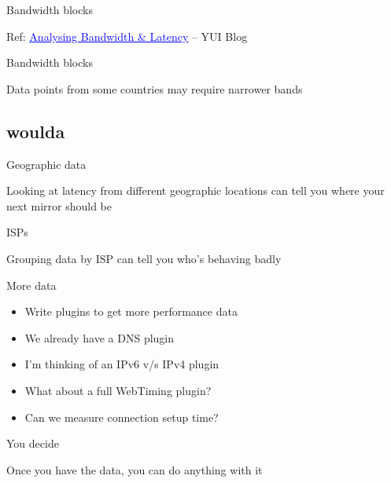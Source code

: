 \documentclass{beamer}
\begin{document}
\begin{frame}{Bandwidth blocks}
  \parbox[c][\paperheight]{\paperwidth}{ }
  \hfill \tiny{Ref: \href{http://www.yuiblog.com/blog/2010/04/08/analyzing-bandwidth-and-latency/}{\textcolor{blue}{\underline{Analysing Bandwidth \& Latency}}} -- YUI Blog}
\end{frame}


\begin{frame}{Bandwidth blocks}
  \begin{center}
  Data points from some countries may require narrower bands
  \end{center}
\end{frame}

\subsection{woulda}
\begin{frame}{Geographic data}
  \begin{center}
  Looking at latency from different geographic locations can tell you where your next mirror should be
  \end{center}
\end{frame}

\begin{frame}{ISPs}
  \begin{center}
  Grouping data by ISP can tell you who's behaving badly
  \end{center}
\end{frame}

\begin{frame}{More data}
  \begin{itemize}
  \item Write plugins to get more performance data
  \item We already have a DNS plugin
  \item I'm thinking of an IPv6 v/s IPv4 plugin
  \item What about a full WebTiming plugin?
  \item Can we measure connection setup time?
  \end{itemize}
\end{frame}

\begin{frame}{You decide}
  \begin{center}
  Once you have the data, you can do anything with it
  \end{center}
\end{frame}
\end{document}

